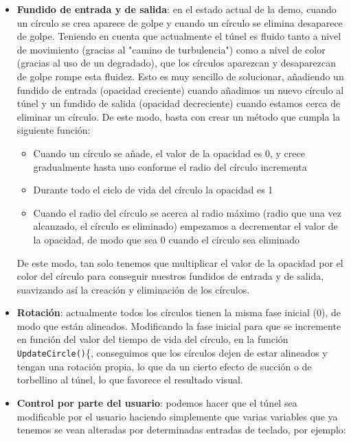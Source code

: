 \begin{itemize}
	\item \textbf{Fundido de entrada y de salida}: en el estado actual de la demo, cuando un círculo se crea aparece de golpe y cuando un círculo se elimina desaparece de golpe. Teniendo en cuenta que actualmente el túnel es fluido tanto a nivel de movimiento (gracias al "camino de turbulencia") como a nivel de color (gracias al uso de un degradado), que los círculos aparezcan y desaparezcan de golpe rompe esta fluidez. Esto es muy sencillo de solucionar, añadiendo un fundido de entrada (opacidad creciente) cuando añadimos un nuevo círculo al túnel y un fundido de salida (opacidad decreciente) cuando estamos cerca de eliminar un círculo. De este modo, basta con crear un método que cumpla la siguiente función:
	
	\begin{itemize}
		\item Cuando un círculo se añade, el valor de la opacidad es 0, y crece gradualmente hasta uno conforme el radio del círculo incrementa
		\item Durante todo el ciclo de vida del círculo la opacidad es 1
		\item Cuando el radio del círculo se acerca al radio máximo (radio que una vez alcanzado, el círculo es eliminado) empezamos a decrementar el valor de la opacidad, de modo que sea 0 cuando el círculo sea eliminado
	\end{itemize}
	
	De este modo, tan solo tenemos que multiplicar el valor de la opacidad por el color del círculo para conseguir nuestros fundidos de entrada y de salida, suavizando así la creación y eliminación de los círculos.
	
	\item \textbf{Rotación}: actualmente todos los círculos tienen la misma fase inicial (0), de modo que están alineados. Modificando la fase inicial para que se incremente en función del valor del tiempo de vida del círculo, en la función \lstinline{UpdateCircle()}\{, conseguimos que los círculos dejen de estar alineados y tengan una rotación propia, lo que da un cierto efecto de succión o de torbellino al túnel, lo que favorece el resultado visual.
	
	\item \textbf{Control por parte del usuario}: podemos hacer que el túnel sea modificable por el usuario haciendo simplemente que varias variables que ya tenemos se vean alteradas por determinadas entradas de teclado, por ejemplo:
	

\end{itemize}
